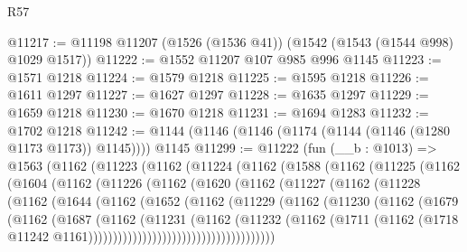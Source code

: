 \begin{lexlean}{R57}
\begin{coremodule}
@11217 := @11198 @11207 (@1526 (@1536 @41)) (@1542 (@1543 (@1544 @998) @1029 @1517))
@11222 := @1552 @11207 @107 @985 @996 @1145
@11223 := @1571 @1218
@11224 := @1579 @1218
@11225 := @1595 @1218
@11226 := @1611 @1297
@11227 := @1627 @1297
@11228 := @1635 @1297
@11229 := @1659 @1218
@11230 := @1670 @1218
@11231 := @1694 @1283
@11232 := @1702 @1218
@11242 := @1144 (@1146 (@1146 (@1174 (@1144 (@1146 (@1280 @1173 @1173)) @1145)))) @1145
@11299 := @11222
    (fun (__b : @1013) =>
    @1563
      (@1162
        (@11223
          (@1162
            (@11224
              (@1162
                (@1588
                  (@1162
                    (@11225
                      (@1162
                        (@1604
                          (@1162
                            (@11226
                              (@1162
                                (@1620
                                  (@1162
                                    (@11227
                                      (@1162
                                        (@11228
                                          (@1162
                                            (@1644
                                              (@1162
                                                (@1652
                                                  (@1162
                                                    (@11229
                                                      (@1162
                                                        (@11230
                                                          (@1162
                                                            (@1679
                                                              (@1162
                                                                (@1687
                                                                  (@1162
                                                                    (@11231
                                                                      (@1162
                                                                        (@11232
                                                                          (@1162
                                                                            (@1711
                                                                              (@1162
                                                                                (@1718
                                                                                  @11242
                                                                                  @1161))))))))))))))))))))))))))))))))))))))

\end{coremodule}
\end{lexlean}
